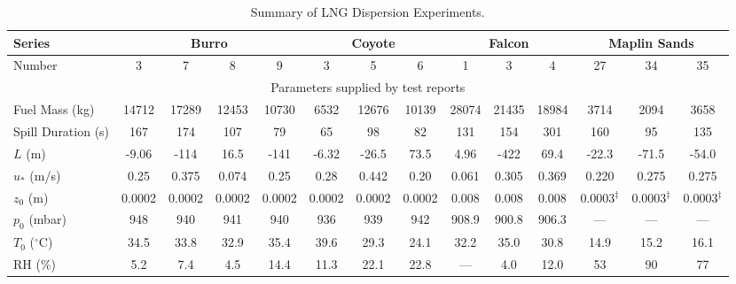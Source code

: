\begin{sidewaystable}[p]
\caption{Summary of LNG Dispersion Experiments.}
\begin{center}
\begin{tabular}{|l|c|c|c|c|c|c|c|c|c|c|c|c|c|}
\hline
Series                   & \multicolumn{4}{|c|}{Burro}       & \multicolumn{3}{|c|}{Coyote}  & \multicolumn{3}{|c|}{Falcon}                  & \multicolumn{3}{|c|}{Maplin Sands}          \\ \hline
Number                   & 3      & 7      & 8      & 9      &  3     & 5      & 6           &  1          & 3           & 4                 &  27             & 34             & 35      \\ \hline \hline
\multicolumn{14}{|c|}{Parameters supplied by test reports} \\ \hline
Fuel Mass (kg)           & 14712  & 17289  & 12453  & 10730  & 6532   & 12676  & 10139       & 28074       & 21435       & 18984             & 3714            & 2094           & 3658    \\ \hline
Spill Duration (s)       & 167    & 174    & 107    & 79     & 65     & 98     & 82          & 131         & 154         & 301               & 160             & 95             & 135     \\ \hline
$L$ (m)                  & -9.06  & -114   & 16.5   & -141   & -6.32  & -26.5  & 73.5        & 4.96        & -422        & 69.4              & -22.3           & -71.5          & -54.0   \\ \hline
$u_*$ (m/s)              & 0.25   & 0.375  & 0.074  & 0.25   & 0.28   & 0.442  & 0.20        & 0.061       & 0.305       & 0.369             & 0.220           & 0.275          & 0.275   \\ \hline
$z_0$ (m)                & 0.0002 & 0.0002 & 0.0002 & 0.0002 & 0.0002 & 0.0002 & 0.0002      & 0.008       & 0.008       & 0.008             & 0.0003$^\ddag$  & 0.0003$^\ddag$ & 0.0003$^\ddag$  \\ \hline
$p_0$ (mbar)             & 948    & 940    & 941    & 940    & 936    & 939    & 942         & 908.9       & 900.8       & 906.3             & ---             & ---            & ---     \\ \hline
$T_0$ ($^\circ$C)        & 34.5   & 33.8   & 32.9   & 35.4   & 39.6   & 29.3   & 24.1        & 32.2        & 35.0        & 30.8              & 14.9            & 15.2           & 16.1    \\ \hline
RH (\%)                  & 5.2    & 7.4    & 4.5    & 14.4   & 11.3   & 22.1   & 22.8        & ---         & 4.0         & 12.0              & 53              & 90             & 77      \\ \hline

\end{tabular}
\end{center}
\end{sidewaystable}
